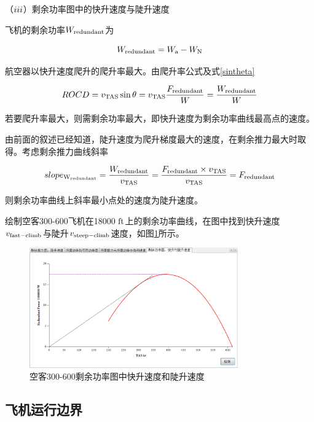 \documentclass[a4paper,punct,space,heading=true,AutoFakeBold]{ctexrep}
\begin{document}
（$\romannumeral3$）剩余功率图中的快升速度与陡升速度

飞机的剩余功率$W_{\rm redundant}$为

\begin{equation}
W_{\rm redundant}=W_{\rm a}-W_{\rm N}
\end{equation}

航空器以快升速度爬升的爬升率最大。由爬升率公式及式\ref{sintheta}

\begin{equation}\label{ROCD}
ROCD=v_{\rm TAS}\sin\theta=v_{\rm TAS}\frac{F_{\rm redundant}}{W}=\frac{W_{\rm redundant}}{W}
\end{equation}

若要爬升率最大，则需剩余功率最大，即快升速度为剩余功率曲线最高点的速度。

由前面的叙述已经知道，陡升速度为爬升梯度最大的速度，在剩余推力最大时取得。考虑剩余推力曲线斜率

\begin{equation}
slope_{\rm W_{redundant}}=\frac{W_{\rm redundant}}{v_{\rm TAS}}=\frac{F_{\rm redundant}\times v_{\rm TAS}}{v_{\rm TAS}}=F_{\rm redundant}
\end{equation}

则剩余功率曲线上斜率最小点处的速度为陡升速度。

绘制空客300-600飞机在18000 $\rm ft$上的剩余功率曲线，在图中找到快升速度$v_{\rm fast-climb}$与陡升$v_{\rm steep-climb}$速度，如图\ref{vfastclimbsteepclimbinredundantW}所示。

\begin{figure}[h]
	\centering
	\includegraphics[width=0.8\textwidth]{pic/vfastclimbsteepclimbinredundantW.eps}\hspace{30pt}
	\caption{空客300-600剩余功率图中快升速度和陡升速度}\label{vfastclimbsteepclimbinredundantW}
\end{figure}

\subsection{飞机运行边界}
\end{document}
